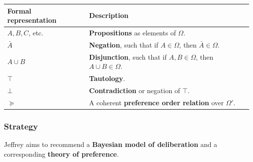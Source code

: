 \documentclass[11pt]{article}
\begin{document}
\begin{center}
\begin{tabular}{l|l}
Formal representation & Description\\
\hline
\(A, B, C\), etc. & \textbf{Propositions} as elements of \(\Omega\).\\
\(\bar{A}\) & \textbf{Negation}, such that if \(A \in \Omega\), then \(\bar{A} \in \Omega\).\\
\(A \cup B\) & \textbf{Disjunction}, such that if \(A, B \in \Omega\), then \(A \cup B \in \Omega\).\\
\(\top\) & \textbf{Tautology}.\\
\(\bot\) & \textbf{Contradiction} or negation of \(\top\).\\
\(\succeq\) & A coherent \textbf{preference order relation} over \(\Omega'\).\\
\end{tabular}
\end{center}
\subsubsection{Strategy}
\label{sec:org6faef30}
Jeffrey aims to recommend a \textbf{Bayesian model of deliberation} and a corresponding \textbf{theory of preference}.
\end{document}
